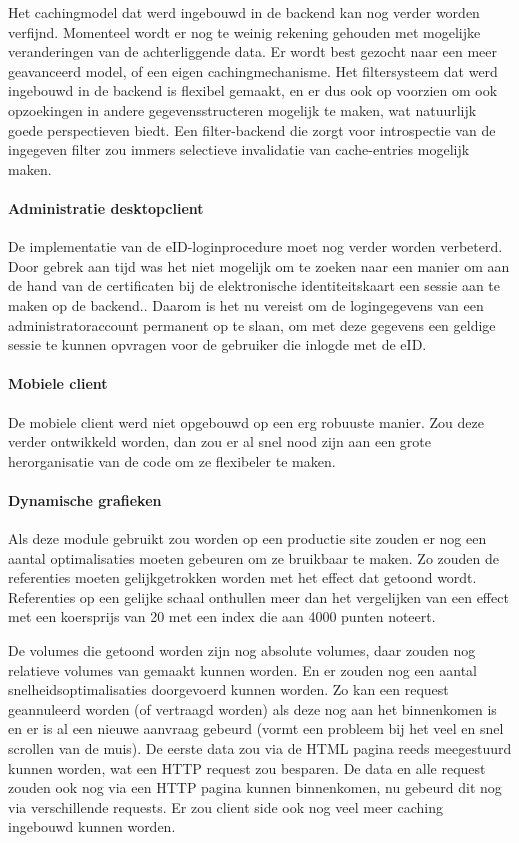 Het cachingmodel dat werd ingebouwd in de backend kan nog verder worden verfijnd. Momenteel wordt er nog te weinig rekening gehouden met mogelijke veranderingen van de achterliggende data. Er wordt best gezocht naar een meer geavanceerd model, of een eigen cachingmechanisme. Het filtersysteem dat werd ingebouwd in de backend is flexibel gemaakt, en er dus ook op voorzien om ook opzoekingen in andere gegevensstructeren mogelijk te maken, wat natuurlijk goede perspectieven biedt. Een filter-backend die zorgt voor introspectie van de ingegeven filter zou immers selectieve invalidatie van cache-entries mogelijk maken.

\paragraph{Administratie desktopclient} De implementatie van de eID-loginprocedure moet nog verder worden verbeterd.  Door gebrek aan tijd was het niet mogelijk om te zoeken naar een manier om aan de hand van de certificaten bij de elektronische identiteitskaart een sessie aan te maken op de backend.. Daarom is het nu vereist om de logingegevens van een administratoraccount permanent op te slaan, om met deze gegevens een geldige sessie te kunnen opvragen voor de gebruiker die inlogde met de eID.

\paragraph{Mobiele client} De mobiele client werd niet opgebouwd op een erg robuuste manier. Zou deze verder ontwikkeld worden, dan zou er al snel nood zijn aan een grote herorganisatie van de code om ze flexibeler te maken.

\paragraph{Dynamische grafieken} Als deze module gebruikt zou worden op een productie site zouden er nog een aantal optimalisaties moeten gebeuren om ze bruikbaar te maken. Zo zouden de referenties moeten gelijkgetrokken worden met het effect dat getoond wordt. Referenties op een gelijke schaal onthullen meer dan het vergelijken van een effect met een koersprijs van 20 met een index die aan 4000 punten noteert.

De volumes die getoond worden zijn nog absolute volumes, daar zouden nog relatieve volumes van gemaakt kunnen worden. En er zouden nog een aantal snelheidsoptimalisaties doorgevoerd kunnen worden. Zo kan een request geannuleerd worden (of vertraagd worden) als deze nog aan het binnenkomen is en er is al een nieuwe aanvraag gebeurd (vormt een probleem bij het veel en snel scrollen van de muis). De eerste data zou via de HTML pagina reeds meegestuurd kunnen worden, wat een HTTP request zou besparen. De data en alle request zouden ook nog via een HTTP pagina kunnen binnenkomen, nu gebeurd dit nog via verschillende requests.
Er zou client side ook nog veel meer caching ingebouwd kunnen worden.

